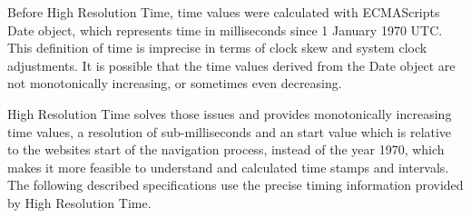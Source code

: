 
Before High Resolution Time, time values were calculated with ECMAScripts Date object, which represents time in milliseconds since 1 January 1970 UTC. %
This definition of time is imprecise in terms of clock skew and system clock adjustments.
It is possible that the time values derived from the Date object are not monotonically increasing, or sometimes even decreasing.

High Resolution Time solves those issues and provides monotonically increasing time values, a resolution of sub-milliseconds and an start value which is relative to the websites start of the navigation process, instead of the year 1970, which makes it more feasible to understand and calculated time stamps and intervals.
The following described specifications use the precise timing information provided by High Resolution Time.







	










